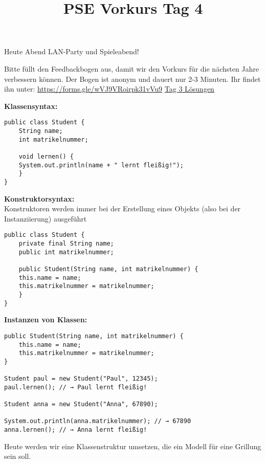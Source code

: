 \documentclass{../../sheet}
\title{PSE Vorkurs Tag 4}
\begin{document}
\maketitle
Heute Abend LAN-Party und Spieleabend!

Bitte füllt den Feedbackbogen aus, damit wir den Vorkurs für die nächsten Jahre verbessern können. Der Bogen ist anonym und dauert nur 2-3 Minuten. \newline Ihr findet ihn unter: \url{https://forms.gle/wVJ9VRoirpk31vVu9}
\href{https://fius.de/wp-content/uploads/2025/10/Day3Musterloesung.zip}{Tag 3 Lösungen}

\textbf{Klassensyntax:}
\begin{verbatim}
public class Student {
    String name;
    int matrikelnummer;

    void lernen() {
	System.out.println(name + " lernt fleißig!");
    }
}
\end{verbatim}

\textbf{Konstruktorsyntax:}\\
Konstruktoren werden immer bei der Erstellung eines Objekts (also bei der Instanziierung) ausgeführt
\begin{verbatim}
public class Student {
    private final String name;
    public int matrikelnummer;

    public Student(String name, int matrikelnummer) {
	this.name = name;
	this.matrikelnummer = matrikelnummer;
    }
}
	\end{verbatim}
\newpage

\textbf{Instanzen von Klassen:}

\begin{verbatim}
public Student(String name, int matrikelnummer) {
    this.name = name;
    this.matrikelnummer = matrikelnummer;
}

Student paul = new Student("Paul", 12345);
paul.lernen(); // → Paul lernt fleißig!

Student anna = new Student("Anna", 67890);

System.out.println(anna.matrikelnummer); // → 67890
anna.lernen(); // → Anna lernt fleißig!

	\end{verbatim}



\newpage

Heute werden wir eine Klassenstruktur umsetzen, die ein Modell für eine Grillung sein soll.
\end{document}
